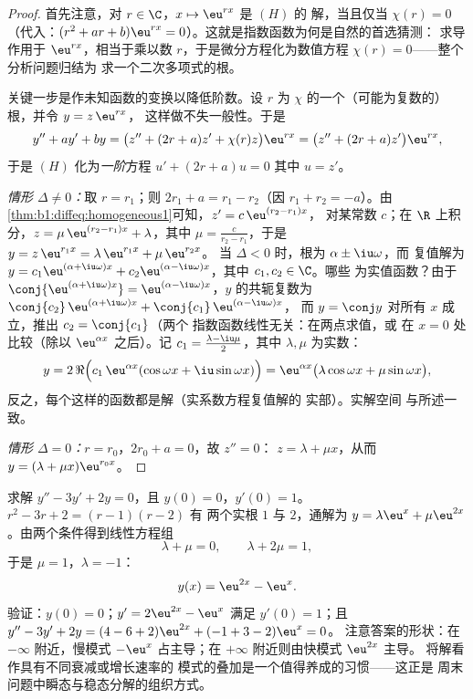 \begin{proof}
首先注意，对 $r \in \C$，$x \mapsto \eu^{rx}$ 是 $(H)$ 的
解，当且仅当 $\chi(r) = 0$（代入：$(r^2 + ar + b)\eu^{rx} =
0$）。这就是指数函数为何是自然的首选猜测：
求导作用于 $\eu^{rx}$，相当于乘以数
$r$，于是微分方程化为数值方程
$\chi(r) = 0$——整个分析问题归结为
求一个二次多项式的根。

关键一步是作未知函数的变换以降低阶数。设 $r$
为 $\chi$ 的一个（可能为复数的）根，并令 $y = z\, \eu^{rx}$，
这样做不失一般性。于是
\[
y'' + ay' + by
= \bigl(z'' + (2r + a) z' + \chi(r) z\bigr)\eu^{rx}
= \bigl(z'' + (2r + a) z'\bigr)\eu^{rx},
\]
于是 $(H)$ 化为\emph{一阶}方程 $u' + (2r + a) u = 0$
其中 $u = z'$。

\emph{情形 $\Delta \neq 0$：}取 $r = r_1$；则 $2r_1 + a = r_1 -
r_2$（因 $r_1 + r_2 = -a$）。由
\cref{thm:b1:diffeq:homogeneous1}可知，$z' = c\,\eu^{(r_2 - r_1)x}$，
对某常数 $c$；在 $\R$ 上积分，$z = \mu\, \eu^{(r_2 - r_1)x}
+ \lambda$，其中 $\mu = \frac{c}{r_2 - r_1}$，于是 $y = z\,
\eu^{r_1 x} = \lambda\,\eu^{r_1x} + \mu\,\eu^{r_2x}$。
当 $\Delta < 0$ 时，根为 $\alpha \pm \iu\omega$，而
复值解为 $y = c_1\eu^{(\alpha+\iu\omega)x} +
c_2\eu^{(\alpha-\iu\omega)x}$，其中 $c_1, c_2 \in \C$。哪些
为实值函数？由于 $\conj{\eu^{(\alpha+\iu\omega)x}} =
\eu^{(\alpha-\iu\omega)x}$，$y$ 的共轭复数为 $\conj{c_2}\,
\eu^{(\alpha+\iu\omega)x} + \conj{c_1}\,\eu^{(\alpha-\iu\omega)x}$，
而 $y = \conj y$ 对所有 $x$ 成立，推出 $c_2 = \conj{c_1}$（两个
指数函数线性无关：在两点求值，或
在 $x=0$ 处比较（除以 $\eu^{\alpha x}$ 之后）。记 $c_1
= \frac{\lambda - \iu\mu}2$，其中 $\lambda, \mu$ 为实数：
\[
y = 2\,\Re\Bigl(c_1\,\eu^{\alpha x}(\cos\omega x +
\iu\sin\omega x)\Bigr)
= \eu^{\alpha x}\bigl(\lambda\cos\omega x + \mu\sin\omega
x\bigr),
\]
反之，每个这样的函数都是解（实系数方程复值解的
实部）。实解空间
与所述一致。

\emph{情形 $\Delta = 0$：}$r = r_0$，$2r_0 + a = 0$，故 $z'' = 0$：
$z = \lambda + \mu x$，从而 $y = (\lambda + \mu x)\eu^{r_0 x}$。
\end{proof}

\begin{example}\label{ex:b1:diffeq:cauchy2}
求解 $y'' - 3y' + 2y = 0$，且 $y(0) = 0$，$y'(0) = 1$。
 $r^2 - 3r + 2 = (r - 1)(r - 2)$ 有
两个实根 $1$ 与 $2$，通解为 $y = \lambda\eu^{x} +
\mu\eu^{2x}$。由两个条件得到线性方程组
\[
\lambda + \mu = 0, \qquad \lambda + 2\mu = 1 ,
\]
于是 $\mu = 1$，$\lambda = -1$：
\[
y(x) = \eu^{2x} - \eu^{x} .
\]
验证：$y(0) = 0$；$y' = 2\eu^{2x} - \eu^x$ 满足 $y'(0) = 1$；且
$y'' - 3y' + 2y = (4 - 6 + 2)\eu^{2x} + (-1 + 3 - 2)\eu^x = 0$。
注意答案的形状：在 $-\infty$ 附近，慢模式
$-\eu^x$ 占主导；在 $+\infty$ 附近则由快模式 $\eu^{2x}$ 主导。
将解看作具有不同衰减或增长速率的
模式的叠加是一个值得养成的习惯——这正是
周末问题中瞬态与稳态分解的组织方式。
\end{example}

